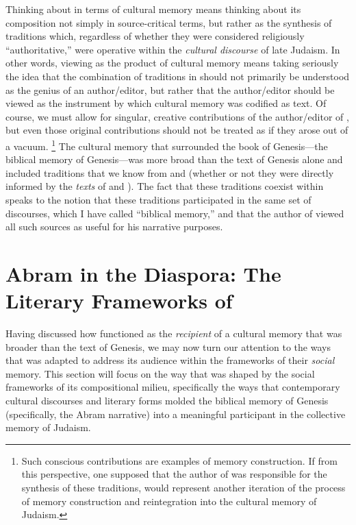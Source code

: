 Thinking about \ga in terms of cultural memory means thinking about its composition not simply in source-critical terms, but rather as the synthesis of traditions which, regardless of whether they were considered religiously ``authoritative,'' were operative within the \emph{cultural discourse} of late \secondtemple Judaism. In other words, viewing \ga as the product of cultural memory means taking seriously the idea that the combination of traditions in \ga should not primarily be understood as the genius of an author/editor, but rather that the author/editor should be viewed as the instrument by which cultural memory was codified as text. Of course, we must allow for singular, creative contributions of the author/editor of \ga, but even those original contributions should not be treated as if they arose out of a vacuum.%
    \footnote{Such conscious contributions are examples of memory construction. If from this perspective, one supposed that the author of \ga was responsible for the synthesis of these traditions, \ga would represent another iteration of the process of memory construction and reintegration into the cultural memory of \secondtemple Judaism.}
The cultural memory that surrounded the book of Genesis---the biblical memory of Genesis---was more broad than the text of Genesis alone and included traditions that we know from \jub and \firstenoch (whether or not they were directly informed by the \emph{texts} of \jub and \firstenoch). The fact that these traditions coexist within \ga speaks to the notion that these traditions participated in the same set of discourses, which I have called ``biblical memory,'' and that the author of \ga viewed all such sources as useful for his narrative purposes.

\section{Abram in the Diaspora: The Literary Frameworks of \GA}

Having discussed how \ga functioned as the \emph{recipient} of a cultural memory that was broader than the text of Genesis, we may now turn our attention to the ways that \ga was adapted to address its audience within the frameworks of their \emph{social} memory. This section will focus on the way that \ga was shaped by the social frameworks of its compositional milieu, specifically the ways that contemporary cultural discourses and literary forms molded the biblical memory of Genesis (specifically, the Abram narrative) into a meaningful participant in the collective memory of \secondtemple Judaism.

